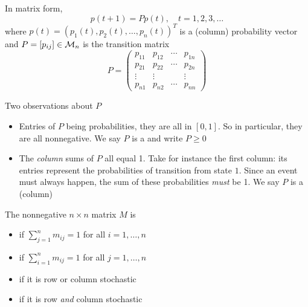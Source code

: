 \documentclass[aspectratio=169]{beamer}
\begin{document}
\begin{frame} 
In matrix form,
\begin{equation}\label{eq:CTMC_vector}
p(t+1)=Pp(t), \quad t=1,2,3,\dots
\end{equation}
where $p(t)=(p_1(t),p_{2}(t),\dots , p_n(t))^T$ is a (column) probability vector and $P=[p_{ij}]\in\mathcal{M}_n$ is the transition matrix
\begin{equation}\label{eq:DMTC_transition_matrix}
P=
\begin{pmatrix}
p_{11} & p_{12} & \cdots & p_{1n} \\
p_{21} & p_{22} & \cdots & p_{2n} \\
\vdots & \vdots && \vdots \\
p_{n1} & p_{n2} & \cdots & p_{nn}
\end{pmatrix}
\end{equation}
\end{frame}


\begin{frame}{Two observations about $P$}
\begin{itemize}
	\item Entries of $P$ being probabilities, they are all in $[0,1]$. So in particular, they are all nonnegative. We say $P$ is a  and write $P\geq 0$
	\vfill
	\item The \emph{column} sums of $P$ all equal 1. Take for instance the first column: its entries represent the probabilities of transition from state $1$. Since an event must always happen, the sum of these probabilities \emph{must} be 1. We say $P$ is a (column) 
\end{itemize}
\end{frame}

\begin{frame} 
\begin{definition}
	The nonnegative $n\times n$ matrix $M$ is
	\begin{itemize}
		\item {} if $\sum_{j=1}^nm_{ij}=1$ for all $i=1,\dots, n$
		\item {} if $\sum_{i=1}^nm_{ij}=1$ for all $j=1,\dots, n$
		\item {} if it is row or column stochastic
		\item {} if it is row \emph{and} column stochastic
	\end{itemize}
\end{definition}
\end{frame}
\end{document}
